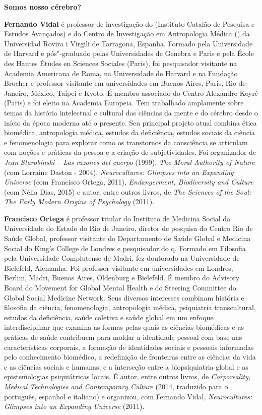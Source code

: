 \textbf{Somos nosso cérebro?} \lipsum[1]

\textbf{Fernando Vidal} é professor de investigação do  (Instituto
Catalão de Pesquisa e Estudos Avançados) e do Centro de Investigação em
Antropologia Médica () da Universidad Rovira i Virgili de Tarragona,
Espanha. Formado pela Universidade de Harvard e pós"-graduado pelas
Universidades de Genebra e Paris e pela École des Hautes Études en
Sciences Sociales (Paris), foi pesquisador visitante na Academia
Americana de Roma, na Universidade de Harvard e na Fundação Brocher e
professor visitante em universidades em Buenos Aires, Paris, Rio de
Janeiro, México, Taipei e Kyoto. É membro associado do Centro Alexandre
Koyré (Paris) e foi eleito na Academia Europeia. Tem trabalhado
amplamente sobre temas da história intelectual e cultural das ciências
da mente e do cérebro desde o início da época moderna até o presente.
Seu principal projeto atual combina ética biomédica, antropologia
médica, estudos da deficiência, estudos sociais da ciência e
fenomenologia para explorar como os transtornos da consciência se
articulam com noções e práticas da pessoa e a criação de subjetividades.
Foi organizador de \emph{Jean Starobinski -- Las razones del cuerpo}
(1999), \emph{The Moral Authority of Nature} (com Lorraine Daston -
2004), \emph{Neurocultures: Glimpses into an Expanding Universe }(com
Francisco Ortega, 2011), \emph{Endangerment, Biodiversity and
Culture} (com Nélia Dias, 2015) e autor, entre outros livros, de \emph{The
Sciences of the Soul: The Early Modern Origins of Psychology} (2011).

\textbf{Francisco Ortega} é professor titular do Instituto de Medicina
Social da Universidade do Estado do Rio de Janeiro, diretor de pesquisa
do Centro Rio de Saúde Global, professor visitante do Departamento de
Saúde Global e Medicina Social do King's College de Londres e
pesquisador do q. Formado em Filosofia pela Universidade
Complutense de Madri, fez doutorado na Universidade de Bielefeld,
Alemanha. Foi professor visitante em universidades em Londres, Berlim,
Madri, Buenos Aires, Oldenburg e Bielefeld. É membro do Advisory
Board do Movement for Global Mental Health e do Steering Committee do
Global Social Medicine Network. Seus diversos interesses combinam
história e filosofia da ciência, fenomenologia, antropologia médica,
psiquiatria transcultural, estudos da deficiência, saúde coletiva e
saúde global em um enfoque interdisciplinar que examina as formas pelas
quais as ciências biomédicas e as práticas de saúde contribuem para
moldar a identidade pessoal com base nas características corporais, a
formação de identidades sociais e pessoais informadas pelo conhecimento
biomédico, a redefinição de fronteiras entre as ciências da vida e as
ciências sociais e humanas, e a interseção entre a biopsiquiatria global
e as epistemologias psiquiátricas locais. É autor, entre outros livros, de
\emph{Corporeality, Medical Technologies and Contemporary Culture} (2014,
traduzido para o português, espanhol e italiano) e organizou, com
Fernando Vidal, \emph{Neurocultures: Glimpses into an Expanding Universe}
(2011).


